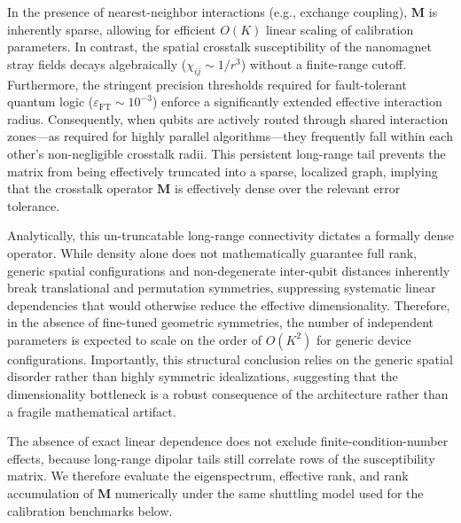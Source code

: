 \documentclass[a4paper,twocolumn,11pt]{quantumarticle}
\begin{document}
In the presence of nearest-neighbor interactions (e.g., exchange coupling), $\mathbf{M}$ is inherently sparse, allowing for efficient $O(K)$ linear scaling of calibration parameters. In contrast, the spatial crosstalk susceptibility of the nanomagnet stray fields decays algebraically ($\chi_{ij} \sim 1/r^3$) without a finite-range cutoff. Furthermore, the stringent precision thresholds required for fault-tolerant quantum logic ($\varepsilon_{\text{FT}} \sim 10^{-3}$) \cite{fowler_surface_2012, xue_quantum_2022} enforce a significantly extended effective interaction radius. Consequently, when qubits are actively routed through shared interaction zones—as required for highly parallel algorithms—they frequently fall within each other's non-negligible crosstalk radii. This persistent long-range tail prevents the matrix from being effectively truncated into a sparse, localized graph, implying that the crosstalk operator $\mathbf{M}$ is effectively dense over the relevant error tolerance.

Analytically, this un-truncatable long-range connectivity dictates a formally dense operator. While density alone does not mathematically guarantee full rank, generic spatial configurations and non-degenerate inter-qubit distances inherently break translational and permutation symmetries, suppressing systematic linear dependencies that would otherwise reduce the effective dimensionality. Therefore, in the absence of fine-tuned geometric symmetries, the number of independent parameters is expected to scale on the order of $O(K^2)$ for generic device configurations. Importantly, this structural conclusion relies on the generic spatial disorder rather than highly symmetric idealizations, suggesting that the dimensionality bottleneck is a robust consequence of the architecture rather than a fragile mathematical artifact.

The absence of exact linear dependence does not exclude finite-condition-number effects, because long-range dipolar tails still correlate rows of the susceptibility matrix. We therefore evaluate the eigenspectrum, effective rank, and rank accumulation of $\mathbf M$ numerically under the same shuttling model used for the calibration benchmarks below.
\end{document}
